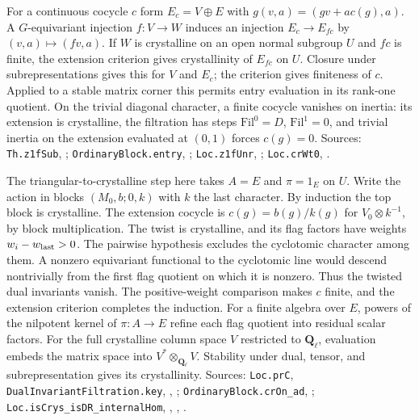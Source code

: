 For a continuous cocycle $c$ form $E_c=V\oplus E$ with
$g(v,a)=(gv+a c(g),a)$. A $G$-equivariant injection $f:V\to W$
induces an injection $E_c\to E_{fc}$ by $(v,a)\mapsto(fv,a)$.
If $W$ is crystalline on an open normal subgroup $U$ and $fc$ is
finite, the extension criterion gives crystallinity of $E_{fc}$ on $U$.
Closure under subrepresentations gives this for $V$ and $E_c$; the
criterion gives finiteness of $c$. Applied to a stable matrix corner
this permits entry evaluation in its rank-one quotient. On the trivial
diagonal character, a finite cocycle vanishes on inertia: its extension
is crystalline, the filtration has steps $\mathrm{Fil}^0=D$,
$\mathrm{Fil}^1=0$, and trivial inertia on the extension evaluated
at $(0,1)$ forces $c(g)=0$. Sources: \nolinkurl{Th.z1fSub},
; \nolinkurl{OrdinaryBlock.entry},
; \nolinkurl{Loc.z1fUnr},
;
\nolinkurl{Loc.crWt0}, .

The triangular-to-crystalline step here takes $A=E$ and $\pi=1_E$ on
$U$. Write the action in blocks $(M_0,b;0,k)$ with $k$ the last
character. By induction the top block is crystalline. The extension
cocycle is $c(g)=b(g)/k(g)$ for $V_0\otimes k^{-1}$, by block
multiplication. The twist is crystalline, and its flag factors have
weights $w_i-w_{\rm last}>0$. The pairwise hypothesis excludes the
cyclotomic character among them. A nonzero equivariant functional to
the cyclotomic line would descend nontrivially from the first flag
quotient on which it is nonzero. Thus the twisted dual invariants
vanish. The positive-weight comparison makes $c$ finite, and the
extension criterion completes the induction. For a finite algebra over
$E$, powers of the nilpotent kernel of $\pi:A\to E$ refine each flag
quotient into residual scalar factors. For the full crystalline column
space $V$ restricted to $\mathbf Q_\ell$, evaluation embeds the matrix
space into $V^*\otimes_{\mathbf Q_\ell}V$. Stability under dual, tensor,
and subrepresentation gives its crystallinity. Sources:
\nolinkurl{Loc.prC}, \nolinkurl{DualInvariantFiltration.key},
,
;
\nolinkurl{OrdinaryBlock.crOn_ad}, ;
\nolinkurl{Loc.isCrys_isDR_internalHom}, ,
, .

